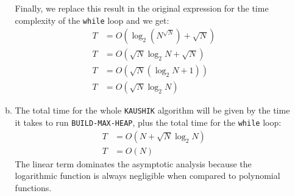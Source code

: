 \documentclass{article}
\begin{document}
\begin{enumerate}[1.]
\begin{enumerate}[(a)]
        Finally, we replace this result in the original expression for the time complexity of the \texttt{while} loop and we get:
        \begin{align*}
            T &= O\left(\log_2\left(N^{\sqrt{N}}\right) + \sqrt{N}\right) \\
            T &= O\left(\sqrt{N} \log_2 N + \sqrt{N}\right) \\
            T &= O\left(\sqrt{N} (\log_2 N + 1)\right) \\
            T &= O\left(\sqrt{N} \log_2 N \right) 
        \end{align*}
        \item The total time for the whole \texttt{KAUSHIK} algorithm will be given by the time it takes to run \texttt{BUILD-MAX-HEAP}, plus the total time for the \texttt{while} loop:
        \begin{align*}
            T &= O\left(N + \sqrt{N}\log_2 N\right) \\
            T &= O(N) 
        \end{align*}
        The linear term dominates the asymptotic analysis because the logarithmic function is always negligible when compared to polynomial functions.

\end{enumerate}
\end{enumerate}
\end{document}
